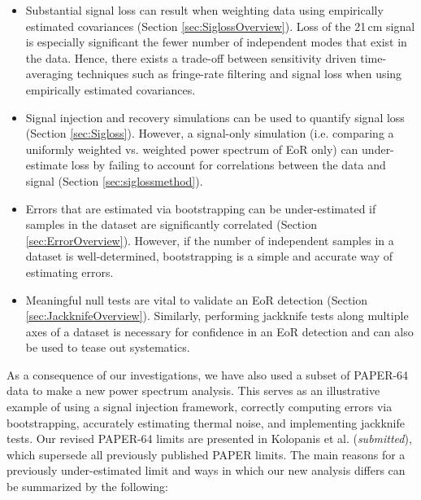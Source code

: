 \documentclass[preprint2,numberedappendix,tighten]{aastex6}  %
\begin{document}
\begin{itemize}
\item Substantial signal loss can result when weighting data using empirically estimated covariances (Section 
\ref{sec:SiglossOverview}). Loss of the 21\,cm signal is especially significant the fewer number of independent modes that
exist in the data. Hence, there exists a trade-off between sensitivity driven 
time-averaging techniques such as fringe-rate filtering and signal loss when using empirically estimated covariances. 
\item Signal injection and recovery simulations can be used to quantify signal loss (Section \ref{sec:Sigloss}). However, a 
signal-only simulation (i.e. comparing a uniformly weighted vs. weighted power spectrum of EoR only) can under-estimate loss by 
failing to account for correlations between the data and signal (Section \ref{sec:siglossmethod}).
\item Errors that are estimated via bootstrapping can be under-estimated if samples in the dataset are significantly correlated 
(Section \ref{sec:ErrorOverview}). However, if the number of independent samples in a dataset is well-determined, bootstrapping is a 
simple and accurate way of estimating errors.
\item Meaningful null tests are vital to validate an EoR detection (Section \ref{sec:JackknifeOverview}). Similarly, performing 
jackknife tests along multiple axes of a dataset is necessary for confidence in an EoR detection and can also be used to tease 
out systematics.
\end{itemize}

As a consequence of our investigations, we have also used a subset of PAPER-64 data to make a new power spectrum analysis. This serves as an illustrative example of using a signal injection framework, correctly computing errors via bootstrapping, accurately estimating thermal noise, and implementing jackknife tests. Our revised PAPER-64 limits are presented in Kolopanis et al. (\textit{submitted}), which supersede all previously published PAPER limits. The main reasons for a previously under-estimated limit and 
ways in which our new analysis differs can be summarized by the following:
\end{document}
